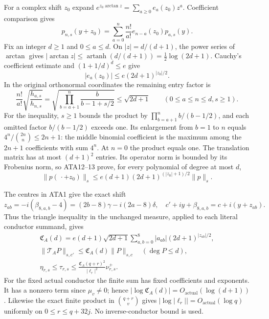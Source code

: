 \documentclass[11pt,a4paper]{article}
\begin{document}
For a complex shift $z_0$ expand
$e^{z_0\arctan z}=\sum_{a\ge0}e_a(z_0)z^a$.
Coefficient comparison gives
\[
 p_{n,s}(y+z_0)=\sum_{a=0}^n\frac{n!}{a!}
                       e_{n-a}(z_0)p_{a,s}(y).         \tag{ATA11}
\]
Fix an integer $d\ge1$ and $0\le a\le d$.  On $|z|=d/(d+1)$,
the power series of $\arctan$ gives
$|\arctan z|\le\operatorname{artanh}(d/(d+1))
=\tfrac12\log(2d+1)$.  Cauchy's coefficient estimate and
$(1+1/d)^d\le e$ give
\[
 |e_a(z_0)|\le e(2d+1)^{|z_0|/2}.                      \tag{ATA12}
\]
In the original orthonormal coordinates the remaining entry factor is
\[
 \frac{n!}{a!}\sqrt{\frac{h_{a,s}}{h_{n,s}}}
  =\sqrt{\prod_{b=a+1}^n\frac{b}{b-1+s/2}}
  \le\sqrt{2d+1}\qquad(0\le a\le n\le d, s\ge1).     \tag{ATA13}
\]
For the inequality, $s\ge1$ bounds the product by
$\prod_{b=a+1}^nb/(b-1/2)$, and each omitted factor $b/(b-1/2)$
exceeds one.  Its enlargement from $b=1$ to $n$ equals
$4^n/\binom{2n}{n}\le2n+1$: the middle binomial coefficient
is the maximum among the $2n+1$ coefficients with sum $4^n$.
At $n=0$ the product equals one.
The translation matrix has at most $(d+1)^2$ entries.  Its operator
norm is bounded by its Frobenius norm, so ATA12--13 prove, for every
polynomial of degree at most $d$,
\[
 \|p(\,\cdot+z_0)\|_s
 \le e(d+1)(2d+1)^{(|z_0|+1)/2}\|p\|_s.                \tag{ATA14}
\]

The centres in ATA1 give the exact shift
\[
 z_{ab}=-i(\beta_{8,a,b}-4)
       =(2b-8)\gamma-i(2a-8)\delta,
 \quad c'+iy+\beta_{8,a,b}=c+i(y+z_{ab}).
\]
Thus the triangle inequality in the unchanged measure, applied to
each literal conductor summand, gives
\[
\begin{gathered}
 \mathfrak C_A(d)=e(d+1)\sqrt{2d+1}
                \sum_{a,b=0}^8|a_{ab}|(2d+1)^{|z_{ab}|/2},\\
 \|\mathcal T_AP\|_{s,c'}\le\mathfrak C_A(d)\|P\|_{s,c}
       \quad(\deg P\le d),\\
 \eta_{r,s}\le\tau_{r,s}
       \le\frac{\mathfrak C_A(q+r)^2}{|\ell_r|^2}\nu^+_{r,s}.
\end{gathered}\tag{ATA15}
\]
For the fixed actual conductor the finite sum has fixed coefficients
and exponents.  It has a nonzero term since $\mu_v\ne0$; hence
$|\log\mathfrak C_A(d)|=O_{\mathrm{actual}}(\log(d+1))$.
Likewise the exact finite product in $\binom{q+r}{v}$ gives
$|\log|\ell_r||=O_{\mathrm{actual}}(\log q)$ uniformly on
$0\le r\le q+32j$.  No inverse-conductor bound is used.
\end{document}
